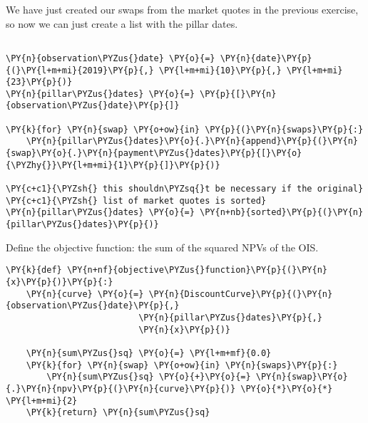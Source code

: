 \begin{Answer}
We have just created our swaps from the market quotes in the previous exercise, so now we can just create a list with the pillar dates.
\begin{tcolorbox}[breakable, size=fbox, boxrule=1pt, pad at break*=1mm,colback=cellbackground, colframe=cellborder]
\begin{Verbatim}[commandchars=\\\{\}]

\PY{n}{observation\PYZus{}date} \PY{o}{=} \PY{n}{date}\PY{p}{(}\PY{l+m+mi}{2019}\PY{p}{,} \PY{l+m+mi}{10}\PY{p}{,} \PY{l+m+mi}{23}\PY{p}{)}
\PY{n}{pillar\PYZus{}dates} \PY{o}{=} \PY{p}{[}\PY{n}{observation\PYZus{}date}\PY{p}{]}

\PY{k}{for} \PY{n}{swap} \PY{o+ow}{in} \PY{p}{(}\PY{n}{swaps}\PY{p}{:}
    \PY{n}{pillar\PYZus{}dates}\PY{o}{.}\PY{n}{append}\PY{p}{(}\PY{n}{swap}\PY{o}{.}\PY{n}{payment\PYZus{}dates}\PY{p}{[}\PY{o}{\PYZhy{}}\PY{l+m+mi}{1}\PY{p}{]}\PY{p}{)}

\PY{c+c1}{\PYZsh{} this shouldn\PYZsq{}t be necessary if the original}
\PY{c+c1}{\PYZsh{} list of market quotes is sorted}
\PY{n}{pillar\PYZus{}dates} \PY{o}{=} \PY{n+nb}{sorted}\PY{p}{(}\PY{n}{pillar\PYZus{}dates}\PY{p}{)}
\end{Verbatim}
\end{tcolorbox}

 Define the objective function: the sum of the squared NPVs of the OIS.

\begin{tcolorbox}[breakable, size=fbox, boxrule=1pt, pad at break*=1mm,colback=cellbackground, colframe=cellborder]
\begin{Verbatim}[commandchars=\\\{\}]
\PY{k}{def} \PY{n+nf}{objective\PYZus{}function}\PY{p}{(}\PY{n}{x}\PY{p}{)}\PY{p}{:}
    \PY{n}{curve} \PY{o}{=} \PY{n}{DiscountCurve}\PY{p}{(}\PY{n}{observation\PYZus{}date}\PY{p}{,}
                          \PY{n}{pillar\PYZus{}dates}\PY{p}{,}
                          \PY{n}{x}\PY{p}{)}
    
    \PY{n}{sum\PYZus{}sq} \PY{o}{=} \PY{l+m+mf}{0.0}
    \PY{k}{for} \PY{n}{swap} \PY{o+ow}{in} \PY{n}{swaps}\PY{p}{:}
        \PY{n}{sum\PYZus{}sq} \PY{o}{+}\PY{o}{=} \PY{n}{swap}\PY{o}{.}\PY{n}{npv}\PY{p}{(}\PY{n}{curve}\PY{p}{)} \PY{o}{*}\PY{o}{*} \PY{l+m+mi}{2}
    \PY{k}{return} \PY{n}{sum\PYZus{}sq}
\end{Verbatim}
\end{tcolorbox}


\end{Answer}
